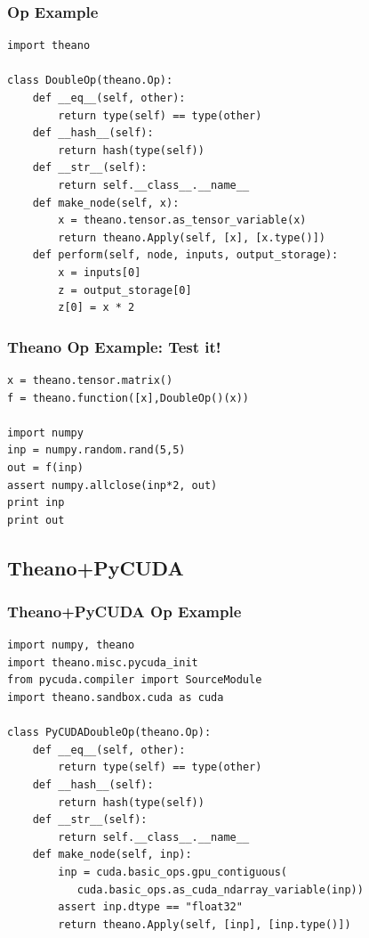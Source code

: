 \documentclass[a4paper,9pt]{beamer}
\begin{document}
\begin{frame}[fragile]
\frametitle{Op Example}
\begin{Verbatim}
import theano

class DoubleOp(theano.Op):
    def __eq__(self, other):
        return type(self) == type(other)
    def __hash__(self):
        return hash(type(self))
    def __str__(self):
        return self.__class__.__name__
    def make_node(self, x):
        x = theano.tensor.as_tensor_variable(x)
        return theano.Apply(self, [x], [x.type()])
    def perform(self, node, inputs, output_storage):
        x = inputs[0]
        z = output_storage[0]
        z[0] = x * 2

\end{Verbatim}
\end{frame}

\begin{frame}[fragile]
\frametitle{Theano Op Example: Test it!}
\begin{Verbatim}
x = theano.tensor.matrix()
f = theano.function([x],DoubleOp()(x))

import numpy
inp = numpy.random.rand(5,5)
out = f(inp)
assert numpy.allclose(inp*2, out)
print inp
print out
\end{Verbatim}
\end{frame}

\subsection{Theano+PyCUDA}
\begin{frame}[fragile]
\frametitle{Theano+PyCUDA Op Example}
\begin{Verbatim}
import numpy, theano
import theano.misc.pycuda_init
from pycuda.compiler import SourceModule
import theano.sandbox.cuda as cuda

class PyCUDADoubleOp(theano.Op):
    def __eq__(self, other):
        return type(self) == type(other)
    def __hash__(self):
        return hash(type(self))
    def __str__(self):
        return self.__class__.__name__
    def make_node(self, inp):
        inp = cuda.basic_ops.gpu_contiguous(
           cuda.basic_ops.as_cuda_ndarray_variable(inp))
        assert inp.dtype == "float32"
        return theano.Apply(self, [inp], [inp.type()])
\end{Verbatim}
\end{frame}
\end{document}
